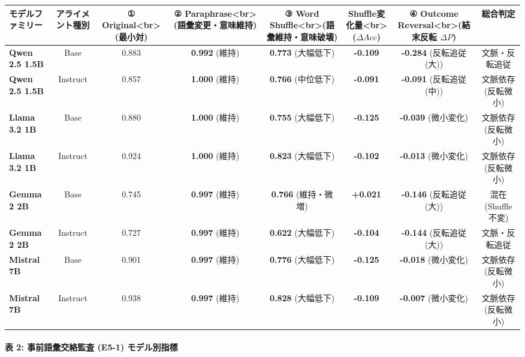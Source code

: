 \begin{center}
\small
\begin{tabular}{lccccccc}
\toprule
\textbf{モデルファミリー} & \textbf{アライメント種別} & \textbf{① Original<br>(最小対)} & \textbf{② Paraphrase<br>(語彙変更・意味維持)} & \textbf{③ Word Shuffle<br>(語彙維持・意味破壊)} & \textbf{Shuffle変化量<br>($\Delta Acc$)} & \textbf{④ Outcome Reversal<br>(結末反転 $\Delta P$)} & \textbf{総合判定} \\
\midrule
\textbf{Qwen 2.5 1.5B} & Base & 0.883 & \textbf{0.992} (維持) & \textbf{0.773} (大幅低下) & \textbf{-0.109} & \textbf{-0.284} (反転追従(大)) & 文脈・反転追従 \\
\textbf{Qwen 2.5 1.5B} & Instruct & 0.857 & \textbf{1.000} (維持) & \textbf{0.766} (中位低下) & \textbf{-0.091} & \textbf{-0.091} (反転追従(中)) & 文脈依存 (反転微小) \\
\textbf{Llama 3.2 1B} & Base & 0.880 & \textbf{1.000} (維持) & \textbf{0.755} (大幅低下) & \textbf{-0.125} & \textbf{-0.039} (微小変化) & 文脈依存 (反転微小) \\
\textbf{Llama 3.2 1B} & Instruct & 0.924 & \textbf{1.000} (維持) & \textbf{0.823} (大幅低下) & \textbf{-0.102} & \textbf{-0.013} (微小変化) & 文脈依存 (反転微小) \\
\textbf{Gemma 2 2B} & Base & 0.745 & \textbf{0.997} (維持) & \textbf{0.766} (維持・微増) & \textbf{+0.021} & \textbf{-0.146} (反転追従(大)) & 混在 (Shuffle不変) \\
\textbf{Gemma 2 2B} & Instruct & 0.727 & \textbf{0.997} (維持) & \textbf{0.622} (大幅低下) & \textbf{-0.104} & \textbf{-0.144} (反転追従(大)) & 文脈・反転追従 \\
\textbf{Mistral 7B} & Base & 0.901 & \textbf{0.997} (維持) & \textbf{0.776} (大幅低下) & \textbf{-0.125} & \textbf{-0.018} (微小変化) & 文脈依存 (反転微小) \\
\textbf{Mistral 7B} & Instruct & 0.938 & \textbf{0.997} (維持) & \textbf{0.828} (大幅低下) & \textbf{-0.109} & \textbf{-0.007} (微小変化) & 文脈依存 (反転微小) \\
\bottomrule
\end{tabular}
\end{center}


\paragraph{表 2: 事前語彙交絡監査 (E5-1) モデル別指標}


